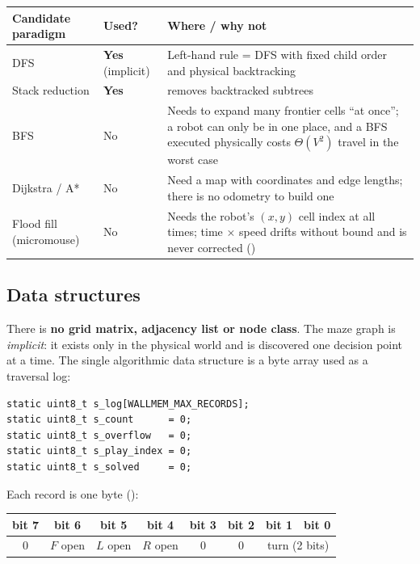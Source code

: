 \documentclass[11pt,a4paper]{article}
\newcommand{\code}[1]{\texttt{\detokenize{#1}}}
\newcommand{\file}[1]{\textsf{\detokenize{#1}}}
\theoremstyle{plain}
\theoremstyle{definition}
\begin{document}
\begin{center}
\small
\begin{tabularx}{\linewidth}{@{}l l X@{}}
\toprule
Candidate paradigm & Used? & Where / why not \\
\midrule
DFS            & \textbf{Yes} (implicit) & Left-hand rule = DFS with fixed child order and physical backtracking \\
Stack reduction & \textbf{Yes} & \code{WallMem_Reduce} removes backtracked subtrees \\
BFS            & No & Needs to expand many frontier cells ``at once''; a robot can only be in one place, and a BFS executed physically costs $\Theta(V^2)$ travel in the worst case \\
Dijkstra / A*  & No & Need a map with coordinates and edge lengths; there is no odometry to build one \\
Flood fill (micromouse) & No & Needs the robot's $(x,y)$ cell index at all times; time $\times$ speed drifts without bound and is never corrected (\file{wallmem.h:24}) \\
\bottomrule
\end{tabularx}
\end{center}

\subsection{Data structures}

There is \textbf{no grid matrix, adjacency list or node class}. The maze
graph is \emph{implicit}: it exists only in the physical world and is
discovered one decision point at a time. The single algorithmic data
structure is a byte array used as a traversal log:

\begin{lstlisting}[firstnumber=21]
static uint8_t s_log[WALLMEM_MAX_RECORDS];
static uint8_t s_count      = 0;
static uint8_t s_overflow   = 0;
static uint8_t s_play_index = 0;
static uint8_t s_solved     = 0;
\end{lstlisting}

Each record is one byte (\file{wallmem.h:30--47}):

\begin{center}
\small
\begin{tabular}{@{}c|c|c|c|c|c|c|c@{}}
bit 7 & bit 6 & bit 5 & bit 4 & bit 3 & bit 2 & bit 1 & bit 0\\\hline
0 & $F$ open & $L$ open & $R$ open & 0 & 0 & \multicolumn{2}{c}{turn (2 bits)}
\end{tabular}
\end{center}
\end{document}
